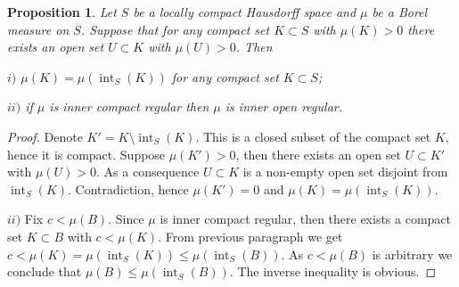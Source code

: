 \documentclass[12pt]{article}
\newtheorem{proposition}[theorem]{Proposition}
\begin{document}
\begin{proposition}\label{NormalMeasCharac} Let $S$ be a locally compact Hausdorff space and $\mu$ be a Borel measure on $S$. Suppose that for any compact set $K\subset S$ with $\mu(K)>0$ there exists an open set $U\subset K$ with $\mu(U)>0$. Then

    $i)$ $\mu(K)=\mu(\operatorname{int}_S(K))$ for any compact set $K\subset S$;

    $ii)$ if $\mu$ is inner compact regular then $\mu$ is inner open regular.
\end{proposition}
\begin{proof} Denote $K'=K\setminus \operatorname{int}_S(K)$. This is a closed subset of the compact set $K$, hence it is compact. Suppose $\mu(K')>0$, then there exists an open set $U\subset K'$ with $\mu(U)>0$. As a consequence $U\subset K$ is a non-empty open set disjoint from $\operatorname{int}_S(K)$. Contradiction, hence $\mu(K')=0$ and $\mu(K)=\mu(\operatorname{int}_S(K))$.

    $ii)$ Fix $c<\mu(B)$. Since $\mu$ is inner compact regular, then there exists a compact set $K\subset B$ with $c<\mu(K)$. From previous paragraph we get $c<\mu(K)=\mu(\operatorname{int}_S(K))\leq\mu(\operatorname{int}_S(B))$. As $c<\mu(B)$ is arbitrary we conclude that $\mu(B)\leq\mu(\operatorname{int}_S(B))$. The inverse inequality is obvious.
\end{proof}
\end{document}
